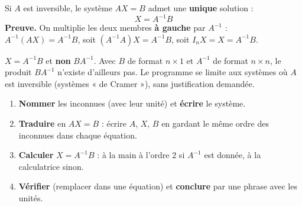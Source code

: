 \documentclass[a4paper,11pt]{article}
\begin{document}
\begin{theoreme}\label{th:resolution}
Si $A$ est inversible, le système $AX=B$ admet une \textbf{unique} solution :
\[
\boxed{X = A^{-1}B}
\]
\textbf{Preuve.} On multiplie les deux membres \textbf{à gauche} par $A^{-1}$ : $A^{-1}(AX) = A^{-1}B$, soit $(A^{-1}A)X = A^{-1}B$, soit $I_nX = X = A^{-1}B$.
\end{theoreme}

\begin{attention}
$X = A^{-1}B$ et \textbf{non} $BA^{-1}$. Avec $B$ de format $n\times 1$ et $A^{-1}$ de format $n\times n$, le produit $BA^{-1}$ n'existe d'ailleurs pas. Le programme se limite aux systèmes où $A$ est inversible (systèmes « de Cramer »), sans justification demandée.
\end{attention}

\begin{methode}\label{meth:systeme}
\begin{enumerate}
  \item \textbf{Nommer} les inconnues (avec leur unité) et \textbf{écrire} le système.
  \item \textbf{Traduire} en $AX=B$ : écrire $A$, $X$, $B$ en gardant le même ordre des inconnues dans chaque équation.
  \item \textbf{Calculer} $X = A^{-1}B$ : à la main à l'ordre 2 si $A^{-1}$ est donnée, à la calculatrice sinon.
  \item \textbf{Vérifier} (remplacer dans une équation) et \textbf{conclure} par une phrase avec les unités.
\end{enumerate}
\end{methode}
\end{document}
